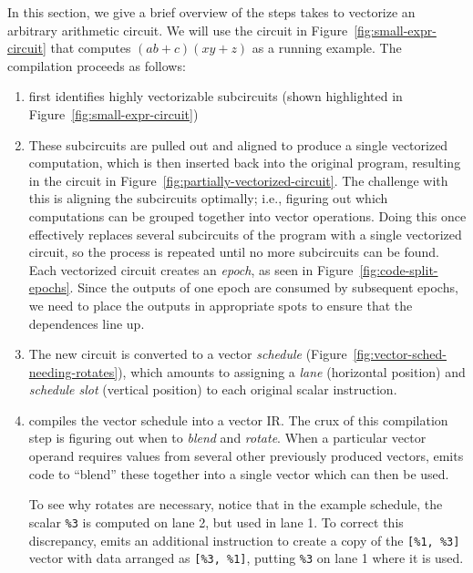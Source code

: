 In this section, we give a brief overview of the steps \system takes to vectorize an arbitrary arithmetic circuit.
We will use the circuit in Figure~\ref{fig:small-expr-circuit} that computes $(ab+c)(xy+z)$ as a running example.
The compilation proceeds as follows:
\begin{enumerate}
    \item \system first identifies highly vectorizable subcircuits (shown highlighted in Figure~\ref{fig:small-expr-circuit})
    \item These subcircuits are pulled out and aligned to produce a single vectorized computation, which is then inserted back into the original program, resulting in the circuit in Figure~\ref{fig:partially-vectorized-circuit}.
    The challenge with this is aligning the subcircuits optimally; i.e., figuring out which computations can be grouped together into vector operations.
    Doing this once effectively replaces several subcircuits of the program with a single vectorized circuit, so the process is repeated until no more subcircuits can be found.
    Each vectorized circuit creates an {\em epoch}, as seen in Figure~\ref{fig:code-split-epochs}.
    Since the outputs of one epoch are consumed by subsequent epochs, we need to place the outputs in appropriate spots to ensure that the dependences line up.
    \item The new circuit is converted to a vector {\em schedule} (Figure~\ref{fig:vector-sched-needing-rotates}), which amounts to assigning a {\em lane} (horizontal position) and {\em schedule slot} (vertical position) to each original scalar instruction.
    \item \system compiles the vector schedule into a vector IR. The crux of this compilation step is figuring out when to {\em blend} and {\em rotate}. When a particular vector operand requires values from several other previously produced vectors, \system emits code to ``blend'' these together into a single vector which can then be used.
    
    To see why rotates are necessary, notice that in the example schedule, the scalar \texttt{\%3} is computed on lane 2, but used in lane 1. 
    To correct this discrepancy, \system emits an additional instruction to create a copy of the \texttt{[\%1, \%3]} vector with data arranged as \texttt{[\%3, \%1]}, putting \texttt{\%3} on lane 1 where it is used. %
\end{enumerate}


